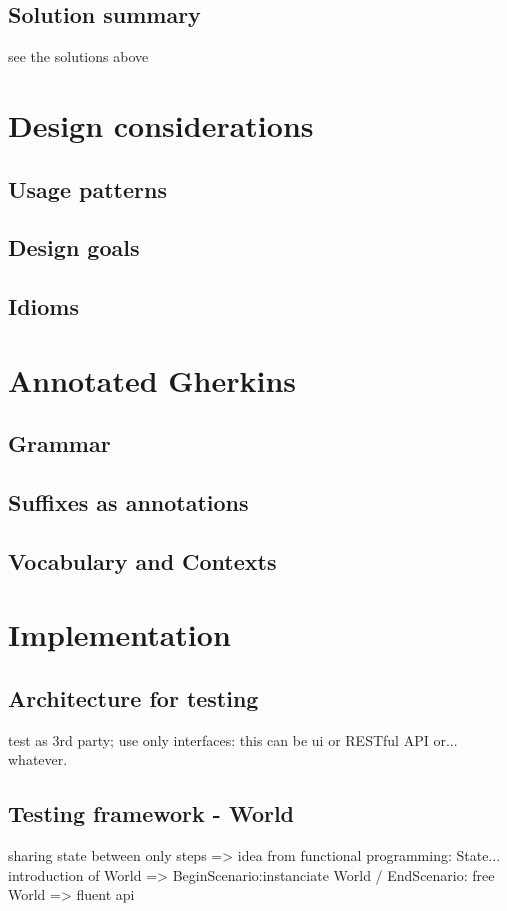 \documentclass[conference]{IEEEtran}
\begin{document}
\subsection{Solution summary}
see the solutions above

\section{Design considerations}
\subsection{Usage patterns}
\subsection{Design goals}
\subsection{Idioms}

\section{Annotated Gherkins}
\subsection{Grammar}
\subsection{Suffixes as annotations}
\subsection{Vocabulary and Contexts}

\section{Implementation}
\subsection{Architecture for testing}
test as 3rd party; use only interfaces: this can be ui or RESTful API or... whatever.
\subsection{Testing framework - World}
sharing state between only steps => idea from functional programming: State... introduction of World => BeginScenario:instanciate World / EndScenario: free World => fluent api
\end{document}
